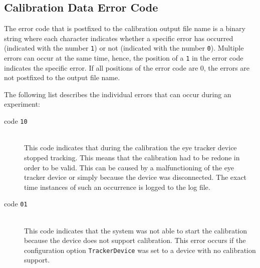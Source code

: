 \documentclass[a4paper,oneside]{book}
\begin{document}
\subsection{Calibration Data Error Code}
\label{sect.calibration.error}
The error code that is postfixed to the calibration output file name is a binary string where each character indicates whether a specific error has occurred (indicated with the number \texttt{1}) or not (indicated with the number \texttt{0}).
Multiple errors can occur at the same time, hence, the position of a \texttt{1} in the error code indicates the specific error.
If all positions of the error code are 0, the errors are not postfixed to the output file name.

The following list describes the individual errors that can occur during an experiment:
\begin{description}
    \item[code \texttt{10}] \hfill \\
        This code indicates that during the calibration the eye tracker device stopped tracking.
        This means that the calibration had to be redone in order to be valid.
        This can be caused by a malfunctioning of the eye tracker device or simply because the device was disconnected.
        The exact time instances of such an occurrence is logged to the log file.
    \item[code \texttt{01}] \hfill \\
        This code indicates that the system was not able to start the calibration because the device does not support calibration.
        This error occurs if the configuration option \texttt{TrackerDevice} was set to a device with no calibration support.
\end{description}


\end{document}

